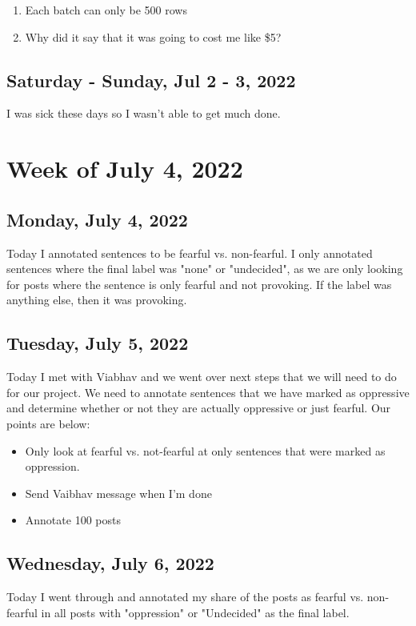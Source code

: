\documentclass[11pt,letterpaper]{article}
\begin{document}
\begin{enumerate}
    \item Each batch can only be 500 rows
    \item Why did it say that it was going to cost me like \$5?
\end{enumerate}

\subsection{Saturday - Sunday, Jul 2 - 3, 2022}
I was sick these days so I wasn't able to get much done.

\section{Week of July 4, 2022}
\subsection{Monday, July 4, 2022}
Today I annotated sentences to be fearful vs. non-fearful. I only annotated sentences where the final label was "none" or "undecided", as we are only looking for posts where the sentence is only fearful and not provoking. If the label was anything else, then it was provoking.

\subsection{Tuesday, July 5, 2022}
Today I met with Viabhav and we went over next steps that we will need to do for our project. We need to annotate sentences that we have marked as oppressive and determine whether or not they are actually oppressive or just fearful. Our points are below:

\begin{itemize}
    \item Only look at fearful vs. not-fearful at only sentences that were marked as oppression.
    \item Send Vaibhav message when I'm done
    \item Annotate 100 posts
\end{itemize}


\subsection{Wednesday, July 6, 2022}
Today I went through and annotated my share of the posts as fearful vs. non-fearful in all posts with "oppression" or "Undecided" as the final label.
\end{document}
